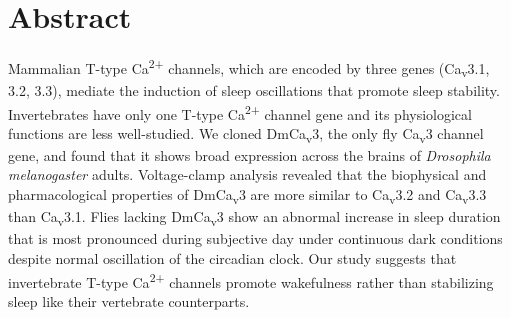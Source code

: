 \section*{Abstract}
Mammalian T-type Ca\textsuperscript{2+} channels, which are encoded by three genes (Ca\textsubscript{v}3.1, 3.2, 3.3), mediate the induction of sleep oscillations that promote sleep stability.
Invertebrates have only one T-type Ca\textsuperscript{2+} channel gene and its physiological functions are less well-studied.
We cloned DmCa\textsubscript{v}3, the only fly Ca\textsubscript{v}3 channel gene, and found that it shows broad expression across the brains of \emph{Drosophila melanogaster} adults.
Voltage-clamp analysis revealed that the biophysical and pharmacological properties of DmCa\textsubscript{v}3 are more similar to Ca\textsubscript{v}3.2 and Ca\textsubscript{v}3.3 than Ca\textsubscript{v}3.1.
Flies lacking DmCa\textsubscript{v}3 show an abnormal increase in sleep duration that is most pronounced during subjective day under continuous dark conditions despite normal oscillation of the circadian clock.
Our study suggests that invertebrate T-type Ca\textsuperscript{2+} channels promote wakefulness rather than stabilizing sleep like their vertebrate counterparts.
    